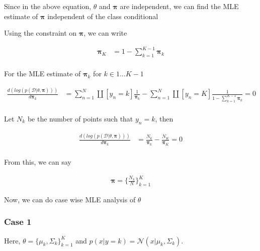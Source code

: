 \documentclass{article}
\begin{document}
\begin{addmargin}{1.5em}
\begin{addmargin}{1.5em}
        Since in the above equation, $\theta$ and $\boldsymbol{\pi}$ are independent, we can find the MLE estimate of $\boldsymbol{\pi}$ independent of the class conditional
        
        Using the constraint on $\boldsymbol{\pi}$, we can write
        
        \begin{align*}
            \boldsymbol{\pi}_K                                                            &= 1 - \sum_{k = 1}^{K - 1} \boldsymbol{\pi}_k \\
        \end{align*}
        
        For the MLE estimate of $\boldsymbol{\pi}_k$ for $k \in {1 ... K-1}$
        
        \begin{align*}
            \frac{d(log(p(\mathcal{D} | \theta, \boldsymbol{\pi})))}{d\boldsymbol{\pi}_k} &= \sum_{n = 1}^{N} \amalg[y_n = k] \frac{1}{\boldsymbol{\pi}_k} - \sum_{n = 1}^{N} \amalg[y_n = K] \frac{1}{1 - \sum_{k = 1}^{K - 1} \boldsymbol{\pi}_k} = 0 \\
        \end{align*}
        
        Let $N_k$ be the number of points such that $y_n = k$, then
        
        \begin{align*}
            \frac{d(log(p(\mathcal{D} | \theta, \boldsymbol{\pi})))}{d\boldsymbol{\pi}_k} &= \frac{N_k}{\boldsymbol{\pi}_k} - \frac{N_K}{\boldsymbol{\pi}_K} = 0 \\
        \end{align*}
        
        From this, we can say
        
        \begin{align*}
            \boldsymbol{\pi} = \{\frac{N_k}{N}\}_{k = 1}^{K}
        \end{align*}
        
        Now, we can do case wise MLE analysis of $\theta$
        
        \subsubsection*{Case 1}
        \begin{addmargin}{1.5em}
        
            Here, $\theta = \{\mu_k, \Sigma_k\}_{k = 1}^{K}$ and $p(x | y = k) = \mathcal{N}(x | \mu_k, \Sigma_k)$.
            

\end{addmargin}
\end{addmargin}
\end{addmargin}
\end{document}
